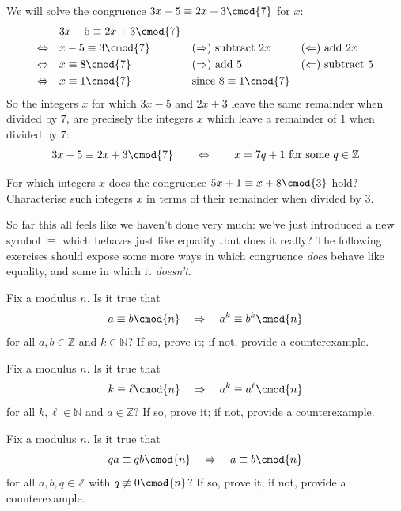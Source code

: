 \begin{example}
We will solve the congruence $3x-5 \equiv 2x+3 \cmod{7}$ for $x$:
\begin{align*}
& 3x-5 \equiv 2x+3 \cmod{7} && && \\
\Leftrightarrow\quad & x-5 \equiv 3 \cmod{7} && \text{$(\Rightarrow)$ subtract $2x$} && \text{$(\Leftarrow)$ add $2x$} \\
\Leftrightarrow\quad & x \equiv 8 \cmod{7} && \text{($\Rightarrow$) add $5$} && \text{($\Leftarrow$) subtract $5$} \\
\Leftrightarrow\quad & x \equiv 1 \cmod{7} && \text{since $8 \equiv 1 \cmod{7}$} &&
\end{align*}
So the integers $x$ for which $3x-5$ and $2x+3$ leave the same remainder when divided by $7$, are precisely the integers $x$ which leave a remainder of $1$ when divided by $7$:
\[ 3x-5 \equiv 2x+3 \cmod{7} \qquad \Leftrightarrow \qquad x = 7q+1 \text{ for some } q \in \mathbb{Z} \]
\end{example}

\begin{exercise}
For which integers $x$ does the congruence $5x+1 \equiv x+8 \cmod{3}$ hold? Characterise such integers $x$ in terms of their remainder when divided by $3$.
\end{exercise}

So far this all feels like we haven't done very much: we've just introduced a new symbol $\equiv$ which behaves just like equality\dots but does it really? The following exercises should expose some more ways in which congruence \textit{does} behave like equality, and some in which it \textit{doesn't}.

\begin{exercise}
Fix a modulus $n$. Is it true that
\[ a \equiv b \cmod{n} \quad \Rightarrow \quad a^k \equiv b^k \cmod{n} \] for all $a,b \in \mathbb{Z}$ and $k \in \mathbb{N}$? If so, prove it; if not, provide a counterexample.
\end{exercise}

\begin{exercise}
Fix a modulus $n$. Is it true that
\[ k \equiv \ell \cmod{n} \quad \Rightarrow \quad a^k \equiv a^{\ell} \cmod{n} \]
for all $k,\ell \in \mathbb{N}$ and $a \in \mathbb{Z}$? If so, prove it; if not, provide a counterexample.
\end{exercise}

\begin{exercise}
Fix a modulus $n$. Is it true that
\[ qa \equiv qb \cmod{n} \quad \Rightarrow \quad a \equiv b \cmod{n} \]
for all $a,b,q \in \mathbb{Z}$ with $q \not \equiv 0 \cmod{n}$? If so, prove it; if not, provide a counterexample.
\end{exercise}

